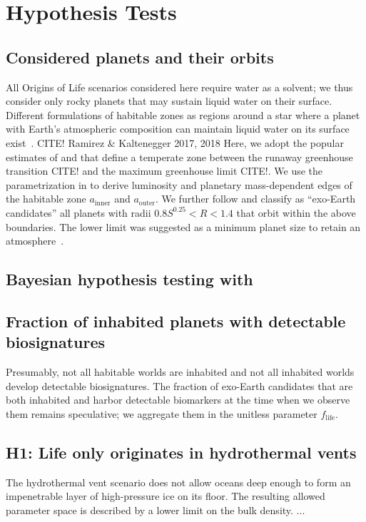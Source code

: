 \documentclass[modern,linenumbers]{aastex631}
\begin{document}
\section{Hypothesis Tests}
\label{sec:hypotests}

\subsection{Considered planets and their orbits}
All Origins of Life scenarios considered here require water as a solvent; we thus consider only rocky planets that may sustain liquid water on their surface.
Different formulations of habitable zones as regions around a star where a planet with Earth's atmospheric composition can maintain liquid water on its surface exist~\citep[e.g.,][]{MolLous2022,Spinelli2023,Tuchow2023}. CITE! Ramirez \& Kaltenegger 2017, 2018
Here, we adopt the popular estimates of \citet{Kasting1993} and \citet{Kopparapu2013,Kopparapu2014} that define a temperate zone between the runaway greenhouse transition CITE! and the maximum greenhouse limit CITE!.
We use the parametrization in \citet{Kopparapu2014} to derive luminosity and planetary mass-dependent edges of the habitable zone $a_\mathrm{inner}$ and $a_\mathrm{outer}$.
We further follow \citet{Bixel2021} and classify as ``exo-Earth candidates'' all planets with radii $0.8 S^{0.25} < R < 1.4 $ that orbit within the above boundaries.
The lower limit was suggested as a minimum planet size to retain an atmosphere~\citep{Zahnle2017}.


\subsection{Bayesian hypothesis testing with \bioverse}

\subsection{Fraction of inhabited planets with detectable biosignatures}
Presumably, not all habitable worlds are inhabited and not all inhabited worlds develop detectable biosignatures.
The fraction of exo-Earth candidates that are both inhabited and harbor detectable biomarkers at the time when we observe them remains speculative; we aggregate them in the unitless parameter $f_\mathrm{life}$.

\subsection{H1: Life only originates in hydrothermal vents}
The hydrothermal vent scenario does not allow oceans deep enough to form an impenetrable layer of high-pressure ice on its floor.
The resulting allowed parameter space is described by a lower limit on the bulk density. 
...
\end{document}
